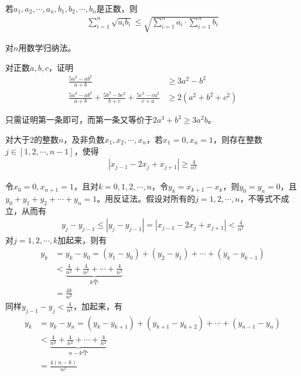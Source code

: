 \begin{question}
  若$a_1,a_2,\cdots,a_n,b_1,b_2,\cdots,b_n$是正数，则
  \begin{align*}
    \sum_{i=1}^n \sqrt{a_ib_i}
    \le
    \sqrt{\sum_{i=1}^n a_i \cdot \sum_{i=1}^n b_i}
  \end{align*}
\end{question}
对$n$用数学归纳法。

\begin{question}
  对正数$a,b,c$，证明
  \begin{align*}
    \frac{5a^3-ab^2}{a+b} & \ge 3a^2-b^2\\
    \frac{5a^3-ab^2}{a+b} + \frac{5b^3-bc^2}{b+c} + \frac{5c^3-ca^2}{c+a} & \ge 2(a^2+b^2+c^2)
  \end{align*}
\end{question}
只需证明第一条即可，而第一条又等价于$2a^3+b^3\ge 3a^2b$。

\begin{question}
  对大于$2$的整数$n$，及非负数$x_1,x_2,\cdots,x_n$，若$x_1=0, x_n=1$，则存在整数$j\in[1,2,\cdots,n-1]$，使得
  \begin{align*}
    \left| x_{j-1} - 2x_j + x_{j+1} \right| \ge \frac{4}{n^2}
  \end{align*}
\end{question}
令$x_0=0,x_{n+1}=1$，且对$k=0,1,2,\cdots,n$，令$y_k=x_{k+1}-x_k$，则$y_0=y_n=0$，且$y_0+y_1+y_2+\cdots+y_n=1$。用反证法。假设对所有的$j=1,2,\cdots,n$，不等式不成立，从而有
\begin{align*}
  y_j - y_{j-1} \le \left| y_j-y_{j-1} \right| = \left| x_{j-1} - 2x_j + x_{j+1} \right| < \frac{4}{n^2}
\end{align*}
对$j=1,2,\cdots,k$加起来，则有
\begin{align*}
  y_k&=y_k-y_0=(y_1-y_0) + (y_2-y_1) + \cdots + (y_k-y_{k-1})\\
  &<\underbrace{\frac{4}{n^2}+\frac{4}{n^2}+\cdots+\frac{4}{n^2}}_{k\text{个}}\\
  &=\frac{4k}{n^2}
\end{align*}
同样$y_{j-1}-y_j<\frac{4}{n^2}$，加起来，有
\begin{align*}
  y_k&=y_{k}-y_n=(y_k-y_{k+1})+(y_{k+1}-y_{k+2})+\cdots+(y_{n-1}-y_{n})\\
  &<\underbrace{ \frac{4}{n^2}+\frac{4}{n^2}+\cdots+\frac{4}{n^2}}_{n-k\text{个}}\\
  &=\frac{4(n-k)}{n^2}
\end{align*}

